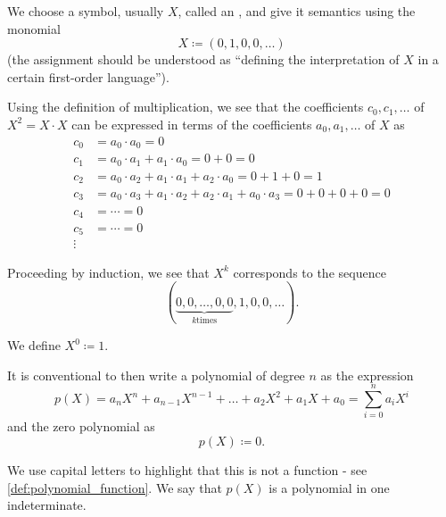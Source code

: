 \begin{remark}\label{remark:polynomial_symbolic_expression}
  We choose a symbol, usually \( X \), called an , and give it semantics using the monomial
  \begin{equation*}
    X \coloneqq (0, 1, 0, 0, \ldots)
  \end{equation*}
  (the assignment should be understood as \enquote{defining the interpretation of \( X \) in a certain first-order language}).

  Using the definition of multiplication, we see that the coefficients \( c_0, c_1, \ldots \) of \( X^2 = X \cdot X \) can be expressed in terms of the coefficients \( a_0, a_1, \ldots \) of \( X \) as
  \begin{align*}
    c_0 &= a_0 \cdot a_0 = 0 \\
    c_1 &= a_0 \cdot a_1 + a_1 \cdot a_0 = 0 + 0 = 0 \\
    c_2 &= a_0 \cdot a_2 + a_1 \cdot a_1 + a_2 \cdot a_0 = 0 + 1 + 0 = 1 \\
    c_3 &= a_0 \cdot a_3 + a_1 \cdot a_2 + a_2 \cdot a_1 + a_0 \cdot a_3 = 0 + 0 + 0 + 0 = 0 \\
    c_4 &= \cdots = 0 \\
    c_5 &= \cdots = 0 \\
    \vdots
  \end{align*}

  Proceeding by induction, we see that \( X^k \) corresponds to the sequence
  \begin{equation*}
    (\underbrace{0, 0, \ldots, 0, 0}_{k \text{times}}, 1, 0, 0, \ldots).
  \end{equation*}

  We define \( X^0 \coloneqq 1 \).

  It is conventional to then write a polynomial of degree \( n \) as the expression
  \begin{equation*}
    p(X) = a_n X^n + a_{n-1} X^{n-1} + \ldots + a_2 X^2 + a_1 X + a_0 = \sum_{i=0}^n a_i X^i
  \end{equation*}
  and the zero polynomial as
  \begin{equation*}
    p(X) \coloneqq 0.
  \end{equation*}

  We use capital letters to highlight that this is not a function - see \cref{def:polynomial_function}. We say that \( p(X) \) is a polynomial in one indeterminate.
\end{remark}

